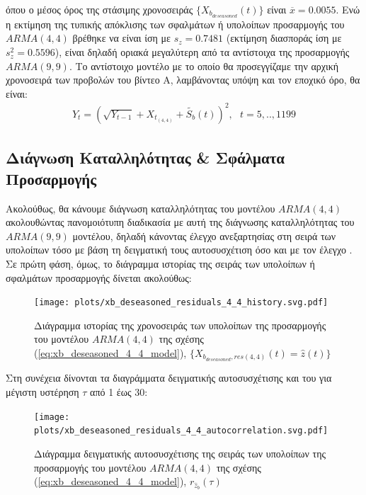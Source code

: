 όπου ο μέσος όρος της στάσιμης χρονοσειράς $\{X_{b_{deseasoned}}(t)\}$ είναι $\overline{x}=0.0055$. Ενώ η εκτίμηση της τυπικής απόκλισης των σφαλμάτων ή υπολοίπων προσαρμογής του $ARMA(4,4)$ βρέθηκε να είναι ίση με \textbf{$s_z = 0.7481$} (εκτίμηση διασποράς ίση με $s_z^2 = 0.5596$), είναι δηλαδή οριακά μεγαλύτερη από τα αντίστοιχα της προσαρμογής $ARMA(9,9)$. Το αντίστοιχο μοντέλο με το οποίο θα προσεγγίζαμε την αρχική χρονοσειρά των προβολών του βίντεο Α, λαμβάνοντας υπόψη και τον εποχικό όρο, θα είναι:
\begin{align}
Y_t = \left(\sqrt{Y_{t-1}} + X_{t_{(4,4)}} + \widetilde{S_b}(t) \right)^2, \ \ \  t=5,..,1199
\label{eq:yb_4_4_model}
\end{align}

\subsection{Διάγνωση Καταλληλότητας \& Σφάλματα Προσαρμογής}

Ακολούθως, θα κάνουμε διάγνωση καταλληλότητας του μοντέλου $ARMA(4,4)$ ακολουθώντας πανομοιότυπη διαδικασία με αυτή της διάγνωσης καταλληλότητας του $ARMA(9,9)$ μοντέλου, δηλαδή κάνοντας έλεγχο ανεξαρτησίας στη σειρά των υπολοίπων τόσο με βάση τη δειγματική τους αυτοσυσχέτιση όσο και με τον έλεγχο . Σε πρώτη φάση, όμως, το διάγραμμα ιστορίας της σειράς των υπολοίπων ή σφαλμάτων προσαρμογής δίνεται ακολούθως:

\begin{figure}[H]
    \begin{center}
        \texttt{[image: plots/xb\_deseasoned\_residuals\_4\_4\_history.svg.pdf]}
        \caption{Διάγραμμα ιστορίας της χρονοσειράς των υπολοίπων της προσαρμογής του μοντέλου $ARMA(4,4)$ της σχέσης (\ref{eq:xb_deseasoned_4_4_model}), $\{X_{b_{deseasoned},res(4,4)}(t) = \hat{z}(t)\}$}
        \label{fig:xb_deseasoned_residuals_4_4_history}
    \end{center}
\end{figure}

Στη συνέχεια δίνονται τα διαγράμματα δειγματικής αυτοσυσχέτισης και  του  για μέγιστη υστέρηση $\tau$ από 1 έως 30:

\begin{figure}[H]
    \begin{center}
        \texttt{[image: plots/xb\_deseasoned\_residuals\_4\_4\_autocorrelation.svg.pdf]}
        \caption{Διάγραμμα δειγματικής αυτοσυσχέτισης της σειράς των υπολοίπων της προσαρμογής του μοντέλου $ARMA(4,4)$  της σχέσης (\ref{eq:xb_deseasoned_4_4_model}), $r_{\hat{z}_b}(\tau)$}
        \label{fig:xb_deseasoned_residuals_4_4_autocorrelation}
    \end{center}
\end{figure}

